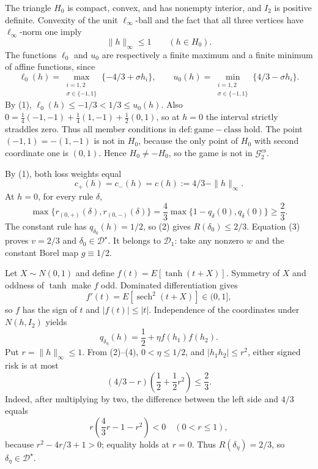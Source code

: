 The triangle \(H_0\) is compact, convex, and has nonempty interior, and \(I_2\) is positive definite. Convexity of the unit \(\ell_{\infty}\)-ball and the fact that all three vertices have \(\ell_{\infty}\)-norm one imply
\[
 \|h\|_{\infty}\leq1\qquad(h\in H_0). \tag{1}
\]
The functions \(\ell_0\) and \(u_0\) are respectively a finite maximum and a finite minimum of affine functions, since
\[
 \ell_0(h)=\max_{\substack{i=1,2\\ \sigma\in\{-1,1\}}}\{-4/3+\sigma h_i\},
 \qquad
 u_0(h)=\min_{\substack{i=1,2\\ \sigma\in\{-1,1\}}}\{4/3-\sigma h_i\}.
\]
By (1), \(\ell_0(h)\leq-1/3<1/3\leq u_0(h)\). Also
\(0=\tfrac14(-1,-1)+\tfrac14(1,-1)+\tfrac12(0,1)\), so at \(h=0\) the interval strictly straddles zero. Thus all member conditions in \(\mathrm{def:game-class}\) hold. The point \((-1,1)=-(1,-1)\) is not in \(H_0\), because the only point of \(H_0\) with second coordinate one is \((0,1)\). Hence \(H_0\neq-H_0\), so the game is not in \(\mathcal G_2^{\mathrm{cs}}\).

By (1), both loss weights equal
\[
 c_{+}(h)=c_{-}(h)=c(h):=4/3-\|h\|_{\infty}. \tag{2}
\]
At \(h=0\), for every rule \(\delta\),
\[
 \max\{r_{(0,+)}(\delta),r_{(0,-)}(\delta)\}
 =\frac43\max\{1-q_{\delta}(0),q_{\delta}(0)\}\geq\frac23. \tag{3}
\]
The constant rule has \(q_{\delta_0}(h)=1/2\), so (2) gives \(R(\delta_0)\leq2/3\). Equation (3) proves \(v=2/3\) and \(\delta_0\in\mathcal D^{\star}\). It belongs to \(\mathcal D_1\): take any nonzero \(w\) and the constant Borel map \(g\equiv1/2\).

Let \(X\sim N(0,1)\) and define \(f(t)=E[\tanh(t+X)]\). Symmetry of \(X\) and oddness of \(\tanh\) make \(f\) odd. Dominated differentiation gives
\[
 f'(t)=E[\operatorname{sech}^2(t+X)]\in(0,1],
\]
so \(f\) has the sign of \(t\) and \(|f(t)|\leq|t|\). Independence of the coordinates under \(N(h,I_2)\) yields
\[
 q_{\delta_{\eta}}(h)=\frac12+\eta f(h_1)f(h_2). \tag{4}
\]
Put \(r=\|h\|_{\infty}\leq1\). From (2)--(4), \(0<\eta\leq1/2\), and \(|h_1h_2|\leq r^2\), either signed risk is at most
\[
 (4/3-r)\left(\frac12+\frac12r^2\right)\leq\frac23. \tag{5}
\]
Indeed, after multiplying by two, the difference between the left side and \(4/3\) equals
\[
 r\left(\frac43r-1-r^2\right)<0\quad(0<r\leq1),
\]
because \(r^2-4r/3+1>0\); equality holds at \(r=0\). Thus \(R(\delta_{\eta})=2/3\), so \(\delta_{\eta}\in\mathcal D^{\star}\).


